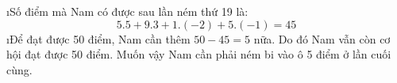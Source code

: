 \begin{Answer}{18}
		\begin{enumerate}[a),leftmargin=*]
			\i	Số điểm mà Nam có được sau lần ném thứ 19 là:
			\[5.5 + 9.3 + 1.\left( { - 2} \right) + 5.\left( { - 1} \right) = 45\]
			\i	Để đạt được 50 điểm, Nam cần thêm $50-45 =5$ nữa. Do đó Nam vẫn còn cơ hội đạt được 50 điểm. Muốn vậy Nam cần phải ném bi vào ô 5 điểm ở lần cuối cùng.
		\end{enumerate}
	
\end{Answer}
